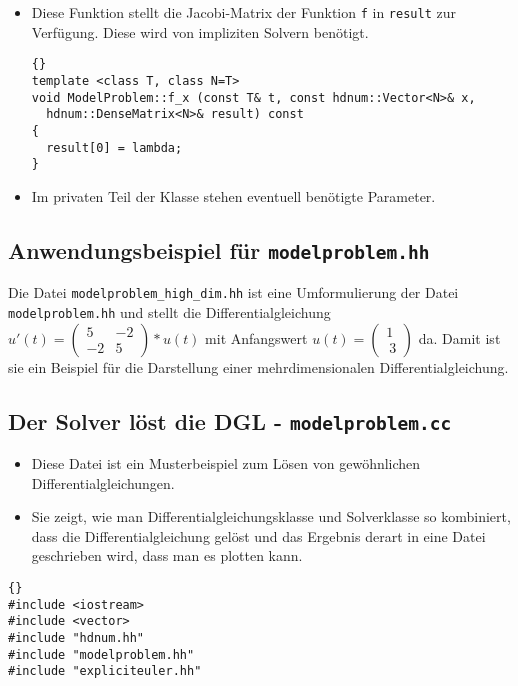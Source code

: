 \documentclass[a4paper,11pt]{article}
\theoremstyle{definition}
\begin{document}
\begin{itemize}
\item Diese Funktion stellt die Jacobi-Matrix der Funktion
  \lstinline{f} in \lstinline{result} zur Verfügung. Diese wird von
  impliziten Solvern benötigt.

{\footnotesize{\begin{lstlisting}{}
template <class T, class N=T>
void ModelProblem::f_x (const T& t, const hdnum::Vector<N>& x,
  hdnum::DenseMatrix<N>& result) const
{
  result[0] = lambda;
}
\end{lstlisting}}}

\item Im privaten Teil der Klasse stehen eventuell benötigte Parameter.

\end{itemize}


\subsection{Anwendungsbeispiel für \lstinline{modelproblem.hh}}
Die Datei \lstinline{modelproblem_high_dim.hh} ist eine Umformulierung
der Datei \lstinline{modelproblem.hh} und stellt die
Differentialgleichung $u'(t) = \begin{pmatrix}
  5 & -2\\
  -2 & 5
\end{pmatrix}*u(t)$ mit Anfangswert
$ u(t) = \left( \begin{array}{c}1 \\\ 3 \end{array}\right)$ da. Damit
ist sie ein Beispiel für die Darstellung einer mehrdimensionalen
Differentialgleichung.

\subsection{Der Solver löst die DGL - \lstinline{modelproblem.cc}}
\begin{itemize}
\item Diese Datei ist ein Musterbeispiel zum Lösen von gewöhnlichen
  Differentialgleichungen.
\item Sie zeigt, wie man Differentialgleichungsklasse und Solverklasse
  so kombiniert, dass die Differentialgleichung gelöst und das
  Ergebnis derart in eine Datei geschrieben wird, dass man es plotten
  kann.
\end{itemize}

{\footnotesize{\begin{lstlisting}{}
#include <iostream>
#include <vector>
#include "hdnum.hh"
#include "modelproblem.hh"
#include "expliciteuler.hh"
\end{lstlisting}}}
\end{document}
